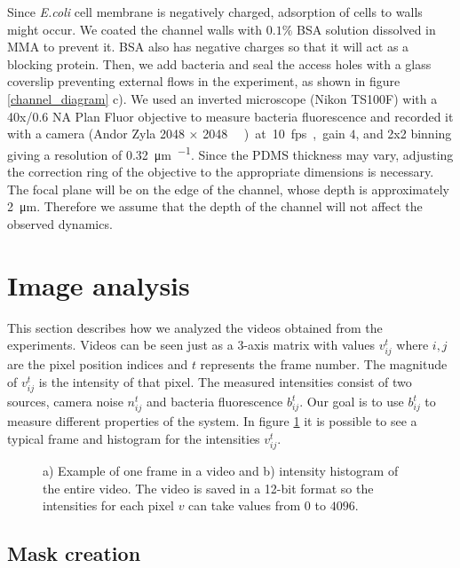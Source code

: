 Since \textit{E.coli} cell membrane is negatively charged, adsorption of cells to walls might occur. We coated the channel walls with $0.1\%$ BSA solution dissolved in MMA to prevent it. BSA also has negative charges so that it will act as a blocking protein. Then, we add bacteria and seal the access holes with a glass coverslip preventing external flows in the experiment, as shown in figure \ref{channel_diagram} c). We used an inverted microscope (Nikon TS100F) with a 40x/0.6 NA Plan Fluor objective to measure bacteria fluorescence and recorded it with a camera (Andor Zyla 2048 × 2048 \SI{}{\square\pixels}) at 10 fps, gain $4$, and 2x2 binning giving a resolution of \SI[per-mode = symbol]{0.32}{\micro\meter\per\pixels}. Since the PDMS thickness may vary, adjusting the correction ring of the objective to the appropriate dimensions is necessary. The focal plane will be on the edge of the channel, whose depth is approximately \SI{2}{\micro\meter}. Therefore we assume that the depth of the channel will not affect the observed dynamics.

\section{Image analysis}


This section describes how we analyzed the videos obtained from the experiments. Videos can be seen just as a 3-axis matrix with values $v_{ij}^t$ where $i,j$ are the pixel position indices and $t$ represents the frame number. The magnitude of $v_{ij}^t$ is the intensity of that pixel. The measured intensities consist of two sources, camera noise $n_{ij}^t$ and bacteria fluorescence $b_{ij}^t$. Our goal is to use $b_{ij}^t$ to measure different properties of the system. In figure \ref{video_histogram} it is possible to see a typical frame and histogram for the intensities $v_{ij}^t$.

\begin{figure}
	\centering
	
	\caption[Typical video frame]{a) Example of one frame in a video and b) intensity histogram of the entire video. The video is saved in a 12-bit format so the intensities for each pixel $v$ can take values from $0$ to $4096$. }
	\label{video_histogram}
\end{figure}


\subsection{Mask creation}

